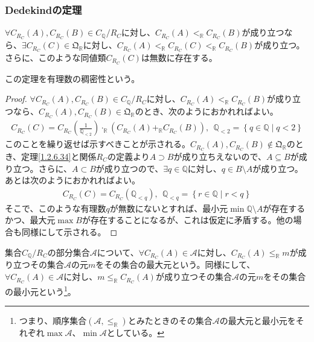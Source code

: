 \documentclass[dvipdfmx]{jsarticle}
\begin{document}
\subsubsection{Dedekindの定理}%
\begin{thm}[有理数の稠密性]\label{1.2.6.37}
$\forall C_{R_{C}}(A),C_{R_{C}}(B) \in C_{\mathbb{Q}} /R_{C} $に対し、$C_{R_{C}}(A) <_{\mathbb{R}}C_{R_{C}}(B)$が成り立つなら、$\exists C_{R_{C}}(C) \in \mathfrak{Q}_{\mathbb{R}}$に対し、$C_{R_{C}}(A) <_{\mathbb{R}}C_{R_{C}}(C) <_{\mathbb{R}}C_{R_{C}}(B)$が成り立つ。さらに、このような同値類$C_{R_{C}}(C)$は無数に存在する。
\end{thm}\par
この定理を有理数の稠密性という。
\begin{proof}
$\forall C_{R_{C}}(A),C_{R_{C}}(B) \in C_{\mathbb{Q}} /R_{C} $に対し、$C_{R_{C}}(A) <_{\mathbb{R}}C_{R_{C}}(B)$が成り立つなら、$C_{R_{C}}(A),C_{R_{C}}(B) \in \mathfrak{Q}_{\mathbb{R}}$のとき、次のようにおかれればよい。
\begin{align*}
C_{R_{C}}(C) = C_{R_{C}}\left( \frac{1}{\mathbb{Q}_{< 2}} \right) \cdot_{\mathbb{R}}\left( C_{R_{C}}(A) +_{\mathbb{R}}C_{R_{C}}(B) \right),\ \ \mathbb{Q}_{< 2} = \left\{ q \in \mathbb{Q} \middle| q < 2 \right\}
\end{align*}
このことを繰り返せば示すべきことが示される。$C_{R_{C}}(A),C_{R_{C}}(B) \notin \mathfrak{Q}_{\mathbb{R}}$のとき、定理\ref{1.2.6.34}と関係$R_{C}$の定義より$A \supset B$が成り立ちえないので、$A \subseteq B$が成り立つ。さらに、$A \subset B$が成り立つので、$\exists q \in \mathbb{Q}$に対し、$q \in B \setminus A$が成り立つ。あとは次のようにおかれればよい。
\begin{align*}
C_{R_{C}}(C) = C_{R_{C}}\left( \mathbb{Q}_{< q} \right),\ \ \mathbb{Q}_{< q} = \left\{ r \in \mathbb{Q} \middle| r < q \right\}
\end{align*}
そこで、このような有理数$q$が無数にないとすれば、最小元$\min{\mathbb{Q} \setminus A}$が存在するかつ、最大元$\max B$が存在することになるが、これは仮定に矛盾する。他の場合も同様にして示される。
\end{proof}
\begin{dfn}
集合$C_{\mathbb{Q}} /R_{C} $の部分集合$\mathcal{A}$について、$\forall C_{R_{C}}(A) \in \mathcal{A}$に対し、$C_{R_{C}}(A) \leq_{\mathbb{R}}m$が成り立つその集合$\mathcal{A}$の元$m$をその集合の最大元という。同様にして、$\forall C_{R_{C}}(A) \in \mathcal{A}$に対し、$m \leq_{\mathbb{R}}C_{R_{C}}(A)$が成り立つその集合$\mathcal{A}$の元$m$をその集合の最小元という\footnote{つまり、順序集合$\left( \mathcal{A}, \leq_{\mathbb{R}} \right)$とみたときのその集合$\mathcal{A}$の最大元と最小元をそれぞれ$\max\mathcal{A}$、$\min\mathcal{A}$としている。}。
\end{dfn}\par
\end{document}
